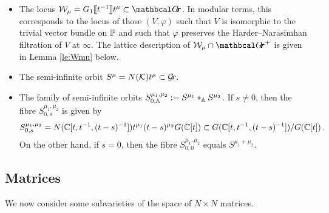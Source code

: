 \documentclass[draft]{article}
\begin{document}
\begin{itemize}
    \item The locus $\cW_\mu = G_1\xt[t^{-1}] t^\mu \subset \Grth $.  
      
    In modular terms, this corresponds to the locus of those $ (V, \varphi)$ such that $ V $ is isomorphic to the trivial vector bundle on $ \PP$ and such that $ \varphi$ preserves the {Harder--Narasimhan filtration of $V$ at $ \infty$}.  The lattice description of $ \cW_\mu \cap \Grth^+$ is given in Lemma \ref{le:Wmu} below. 
    \item The semi-infinite orbit $ S^\mu = N(\cK)t^\mu \subset \Gr $.  
    \item The family of semi-infinite orbits $ S^{\mu_1, \mu_2}_{0,\AA} := S^{\mu_1} \ast_\AA S^{\mu_2}$.  If $ s \ne 0 $, then the fibre $S^{\mu_1, \mu_2}_{0,s} $ is given by
    $$
    S^{\mu_1, \mu_2}_{0,s} = N(\CC[t, t^{-1}, (t-s)^{-1}])t^{\mu_1} (t-s)^{\mu_2} G(\CC[t])\subset G(\CC[t,t^{-1}, (t-s)^{-1}]) / G(\CC[t]) \,. %
    $$
    On the other hand, if $ s = 0$, then the fibre $S^{\mu_1, \mu_2}_{0,0} $ equals $ S^{\mu_1 + \mu_2}$. 
    
    
\end{itemize}

\subsection{Matrices}
 We now consider some subvarieties of the space of $ N\times N$ matrices. 
\end{document}
